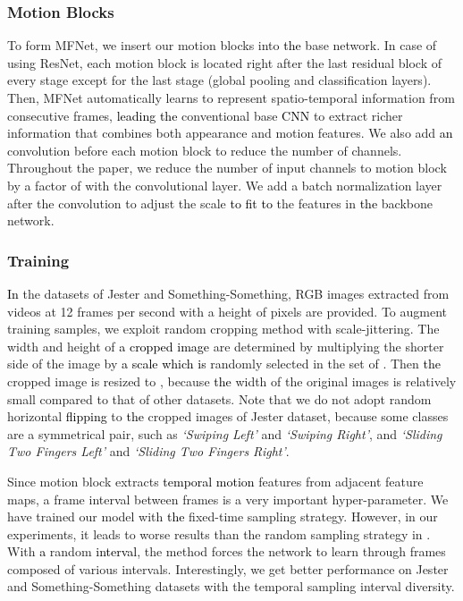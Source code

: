 \documentclass[runningheads]{llncs}
\newcommand{\nj}[1]{\textcolor{black}{#1}}
\begin{document}
\subsubsection{Motion Blocks}
To form MFNet, we insert our motion blocks into \nj{the} base network. In case of using ResNet, each motion block is located right after the last residual block of every stage except for the last stage (global pooling and classification layers). Then, MFNet automatically learns to represent spatio-temporal information from consecutive frames, \nj{leading} \nj{the} conventional base \nj{CNN} to extract richer information that combines both appearance and motion features. We also add \nj{an}  convolution before each motion block to reduce the number of channels. Throughout the paper, we reduce the number of input channels to motion block by a factor of  with the  convolutional layer. We add a batch normalization layer after the  convolution to adjust the scale \nj{to fit to} the features in \nj{the} backbone network. 

\subsubsection{Training}
\nj{In} the datasets of Jester and Something-Something, RGB images extracted from videos at 12 frames per second with a height of  pixels are provided. To augment training samples, we exploit random cropping method with scale-jittering. The width and height of \nj{a cropped image} are determined by multiplying the shorter side of the image by \nj{a scale which is} randomly selected in the set of . Then \nj{the} cropped image is resized to , because \nj{the} width of the original images is relatively small compared to that of other datasets.
Note that we do not adopt random horizontal \nj{flipping} to \nj{the} cropped images of Jester dataset, because some classes are a symmetrical pair, such as \textit{`Swiping Left'} and \textit{`Swiping Right'}, and \textit{`Sliding Two Fingers Left'} and \textit{`Sliding Two Fingers Right'}. 

Since motion block extracts \nj{temporal motion} features from adjacent feature maps, a frame interval between frames is a very important hyper-parameter. We have trained our model with \nj{the} fixed-time sampling strategy. However, in our experiments, it leads to worse results than the random sampling strategy in \cite{wang2016temporal}. With \nj{a} random \nj{interval}, the method forces the network to learn through frames composed of various intervals. Interestingly, we get better performance on Jester and Something-Something datasets with the temporal sampling interval diversity. 
\end{document}

